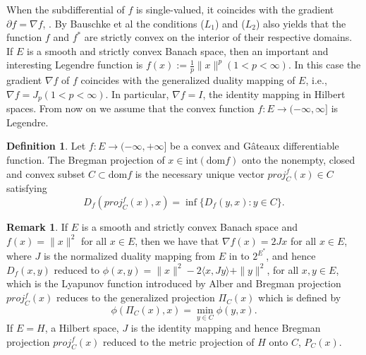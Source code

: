 \documentclass[reqno,b5paper]{amsart}
\theoremstyle{plain}
\theoremstyle{definition}
\newtheorem{definition}[theorem]{Definition}
\newtheorem{remark}[theorem]{Remark}
\numberwithin{equation}{section}
\numberwithin{equation}{section}
\begin{document}
When the subdifferential of $f$ is single-valued, it coincides with the gradient $\partial f=\nabla f$, \cite{phe}. By Bauschke
et al \cite{bau} the conditions ($L_{1}$) and ($L_{2}$) also yields that the function $f$ and $f^{*}$ are strictly convex on the interior of their respective domains.\\
If $E$ is a smooth and strictly convex Banach space, then an important and interesting Legendre function is $f(x):=\frac{1}{p}\|x\|^{p} (1<p<\infty).$ In this case the gradient $\nabla f$ of $f$ coincides with the generalized duality mapping of $E$, i.e., $\nabla f=J_{p} (1<p<\infty).$ In particular, $\nabla f=I$, the identity mapping in Hilbert spaces. From now on we assume that the convex function $f:E\to (-\infty, \infty]$ is Legendre.
\begin{definition}
Let $f:E\to (-\infty,+\infty]$ be a convex and G\^{a}teaux differentiable function. The Bregman projection of $x\in \text{int}(\text{dom} f)$ onto the nonempty, closed and convex subset $C\subset \text{dom} f$ is the necessary unique vector $proj_{C}^{f}(x)\in C$ satisfying 
$$D_{f}(proj_{C}^{f}(x),x)=\inf\{D_{f}(y,x) : y\in C\}.$$
\end{definition}
\begin{remark}
If $E$ is a smooth and strictly convex Banach space and $f(x)=\|x\|^{2}$ for all $x\in E$, then we have that $\nabla f(x)=2Jx$ for all $x\in E$, where $J$ is the normalized duality mapping from $E$ in to $2^{E^{*}}$, and hence $D_{f}(x,y)$ reduced to $\phi(x,y)=\|x\|^{2}-2\langle x,Jy\rangle +\|y\|^{2}$, for all $x,y\in E$, which is the Lyapunov function introduced by Alber \cite{alb} and Bregman projection $proj_{C}^{f}(x)$ reduces to the generalized projection $\Pi_{C}(x)$ which is defined by
$$\phi(\Pi_{C}(x),x)=\min_{ y\in C} \phi(y,x).$$
If $E=H$, a Hilbert space, $J$ is  the identity mapping and hence Bregman projection $proj_{C}^{f}(x)$ reduced to the metric projection of $H$ onto $C$, $P_{C}(x)$.
\end{remark}
\end{document}
